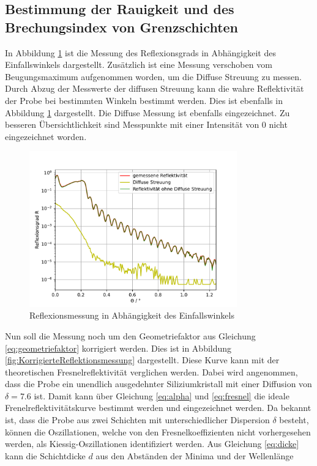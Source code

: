 \subsection{Bestimmung der Rauigkeit und des Brechungsindex von Grenzschichten}
In Abbildung \ref{fig:Reflektionsmessung} ist die Messung des Reflexionsgrads in Abhängigkeit des Einfallswinkels dargestellt.
Zusätzlich ist eine Messung verschoben vom Beugungsmaximum aufgenommen worden, um die Diffuse Streuung zu messen. Durch Abzug der Messwerte 
der diffusen Streuung kann die wahre Reflektivität der Probe bei bestimmten Winkeln bestimmt werden. Dies ist ebenfalls in Abbildung \ref{fig:Reflektionsmessung} dargestellt.
Die Diffuse Messung ist ebenfalls eingezeichnet. Zu besseren Übersichtlichkeit sind Messpunkte mit einer Intensität von 0 nicht eingezeichnet worden.
\begin{figure}[H]
    \centering
    \includegraphics[width=0.8\textwidth]{plots/Reflektionsmessung.pdf}
    \caption{Reflexionsmessung in Abhängigkeit des Einfallswinkels}
    \label{fig:Reflektionsmessung}
\end{figure}
Nun soll die Messung noch um den Geometriefaktor aus Gleichung \eqref{eq:geometriefaktor} korrigiert werden. Dies ist in Abbildung \ref{fig:KorrigierteReflektionsmessung} dargestellt.
Diese Kurve kann mit der theoretischen Fresnelreflektivität verglichen werden. Dabei wird angenommen, dass die Probe ein unendlich ausgedehnter Siliziumkristall mit 
einer Diffusion von $\delta=7.6$ \cite{m-tolan2013} ist. Damit kann über Gleichung \eqref{eq:alpha} und \eqref{eq:fresnel} die ideale Frenelreflektivitätskurve bestimmt werden und eingezeichnet werden.
Da bekannt ist, dass die Probe aus zwei Schichten mit unterschiedlicher Dispersion $\delta$ besteht, können die Oszillationen, welche von den 
Fresnelkoeffizienten nicht vorhergesehen werden, als Kiessig-Oszillationen identifiziert werden. Aus Gleichung \eqref{eq:dicke} kann die Schichtdicke $d$ aus den Abständen der Minima und der Wellenlänge 
